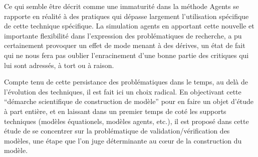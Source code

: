 

Ce qui semble être décrit comme une immaturité dans la méthode Agents \autocite{Heath2009} se rapporte en réalité à des pratiques qui dépasse largement l'utilisation spécifique de cette technique spécifique. La simulation agents en apportant cette nouvelle et importante flexibilité dans l'expression des problématiques de recherche, a pu certainement provoquer un effet de mode menant à des dérives, un état de fait qui ne nous fera pas oublier l'enracinement d'une bonne partie des critiques qui lui sont adressés, à tort ou à raison.

Compte tenu de cette persistance des problématiques dans le temps, au delà de l'évolution des techniques, il est fait ici un choix radical. En objectivant cette \enquote{démarche scientifique de construction de modèle} pour en faire un objet d'étude à part entière, et en laissant dans un premier temps de coté les supports techniques (modèles équationels, modèles agents, etc.), il est proposé dans cette étude de se concentrer sur la problématique de validation/vérification des modèles, une étape que l'on juge déterminante au cœur de la construction du modèle. 

